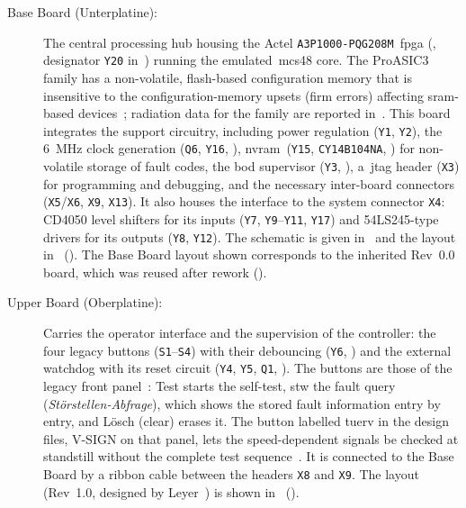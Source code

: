 \begin{description}
	\item[Base Board (Unterplatine):] The central processing hub housing the Actel \texttt{A3P1000-\allowbreak PQG208M}~\gls{fpga} (, designator \texttt{Y20} in~) running the emulated~\gls{mcs48} core. The ProASIC3 family has a non-volatile, flash-based configuration memory that is insensitive to the configuration-memory upsets (firm errors) affecting \gls{sram}-based devices~\cite{guzman2011obsolescence}; radiation data for the family are reported in~\cite{poivey2011proasic3}. This board integrates the support circuitry, including power regulation (\texttt{Y1}, \texttt{Y2}), the \SI{6}{\mega\hertz} clock generation (\texttt{Q6}, \texttt{Y16}, ), \gls{nvram}~(\texttt{Y15}, \texttt{CY14B104NA}, ) for non-volatile storage of fault codes, the \gls{bod} supervisor (\texttt{Y3}, ), a~\gls{jtag} header (\texttt{X3}) for programming and debugging, and the necessary inter-board connectors (\texttt{X5}/\texttt{X6}, \texttt{X9}, \texttt{X13}). It also houses the interface to the system connector \texttt{X4}: CD4050 level shifters for its inputs (\texttt{Y7}, \texttt{Y9}--\texttt{Y11}, \texttt{Y17}) and 54LS245-type drivers for its outputs (\texttt{Y8}, \texttt{Y12}). The schematic is given in~ and the layout in~ (). The Base Board layout shown corresponds to the inherited Rev~0.0 board, which was reused after rework ().

	\item[Upper Board (Oberplatine):] Carries the operator interface and the supervision of the controller: the four legacy buttons (\texttt{S1}--\texttt{S4}) with their debouncing (\texttt{Y6}, ) and the external watchdog with its reset circuit (\texttt{Y4}, \texttt{Y5}, \texttt{Q1}, ). The buttons are those of the legacy front panel~\cite[Blatt~5/25]{rexroth1992wsp}: Test starts the self-test, \gls{stw} the fault query (\emph{Störstellen-Abfrage}), which shows the stored fault information entry by entry, and Lösch (clear) erases it. The button labelled \gls{tuerv} in the design files, V-SIGN on that panel, lets the speed-dependent signals be checked at standstill without the complete test sequence~\cite[Blatt~14/25, 19/25]{rexroth1992wsp}. It is connected to the Base Board by a ribbon cable between the headers \texttt{X8} and \texttt{X9}. The layout (Rev~1.0, designed by Leyer~\cite{leyer2023}) is shown in~ ().


\end{description}
